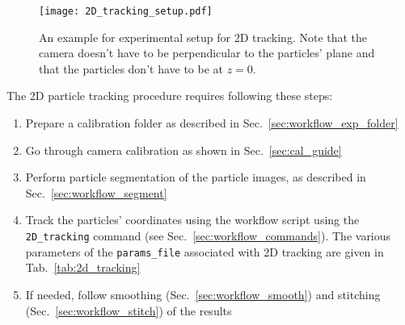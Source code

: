 \documentclass[10pt,a4paper]{article}
\begin{document}
\begin{figure}
	\centering
	\texttt{[image: 2D\_tracking\_setup.pdf]}
	\caption{An example for experimental setup for 2D tracking. Note that the camera doesn't have to be perpendicular to the particles' plane and that the particles don't have to be at $z=0$. \label{fig:2D_tracking}}
\end{figure}


The 2D particle tracking procedure requires following these steps:
%
\begin{enumerate}
	\item Prepare a calibration folder as described in Sec.~\ref{sec:workflow_exp_folder}
	\item Go through camera calibration as shown in Sec.~\ref{sec:cal_guide}
	\item Perform particle segmentation of the particle images, as described in Sec.~\ref{sec:workflow_segment}
	\item Track the particles' coordinates using the workflow script using the \texttt{2D\_tracking} command (see Sec.~\ref{sec:workflow_commands}). The various parameters of the \texttt{params\_file} associated with 2D tracking are given in Tab.~\ref{tab:2d_tracking}
	\item If needed, follow smoothing (Sec.~\ref{sec:workflow_smooth}) and stitching (Sec.~\ref{sec:workflow_stitch}) of the results
\end{enumerate}
%
\end{document}
